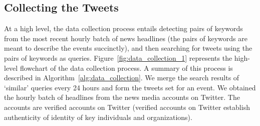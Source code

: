 \subsection{Collecting the Tweets}
\label{sec:collecting_the_data}
At a high level, the data collection process entails detecting pairs
of keywords from the most recent hourly batch of news headlines (the
pairs of keywords are meant to describe the events succinctly), and
then searching for tweets using the pairs of keywords as queries.
Figure~\ref{fig:data_collection_1} represents the high-level flowchart
of the data collection process. A summary of this process is described
in Algorithm~\ref{alg:data_collection}. We merge the search results of
`similar' queries every 24 hours and form the tweets set for an event.
We obtained the hourly batch of headlines from the news media accounts
on Twitter. The accounts are verified accounts on
Twitter (verified accounts on Twitter establish authenticity
  of identity of key individuals and organizations).



